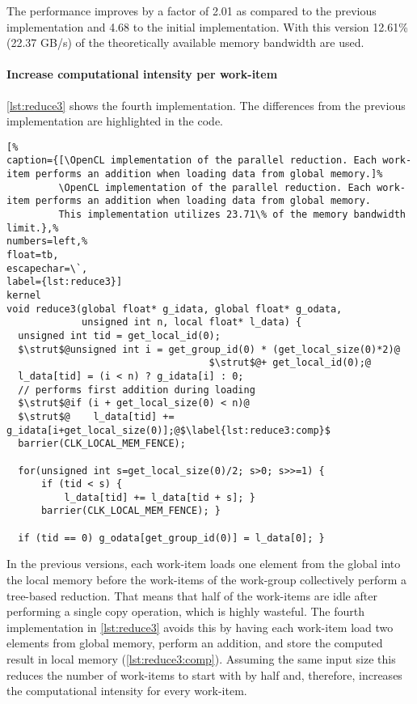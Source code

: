 The performance improves by a factor of 2.01 as compared to the previous implementation and 4.68 to the initial implementation.
With this version 12.61\% (22.37 GB/s) of the theoretically available memory bandwidth are used.



\FloatBarrier
\newpage

\paragraph{Increase computational intensity per work-item}

\autoref{lst:reduce3} shows the fourth implementation.
The differences from the previous implementation are highlighted in the code.
\begin{lstlisting}[%
caption={[\OpenCL implementation of the parallel reduction. Each work-item performs an addition when loading data from global memory.]%
         \OpenCL implementation of the parallel reduction. Each work-item performs an addition when loading data from global memory.
         This implementation utilizes 23.71\% of the memory bandwidth limit.},%
numbers=left,%
float=tb,
escapechar=\`,
label={lst:reduce3}]
kernel
void reduce3(global float* g_idata, global float* g_odata,
             unsigned int n, local float* l_data) {
  unsigned int tid = get_local_id(0);
  $\strut$@unsigned int i = get_group_id(0) * (get_local_size(0)*2)@
                                   $\strut$@+ get_local_id(0);@
  l_data[tid] = (i < n) ? g_idata[i] : 0;
  // performs first addition during loading
  $\strut$@if (i + get_local_size(0) < n)@
  $\strut$@    l_data[tid] += g_idata[i+get_local_size(0)];@$\label{lst:reduce3:comp}$
  barrier(CLK_LOCAL_MEM_FENCE);

  for(unsigned int s=get_local_size(0)/2; s>0; s>>=1) {
      if (tid < s) {
          l_data[tid] += l_data[tid + s]; }
      barrier(CLK_LOCAL_MEM_FENCE); }

  if (tid == 0) g_odata[get_group_id(0)] = l_data[0]; }
\end{lstlisting}

In the previous versions, each work-item loads one element from the global into the local memory before the work-items of the work-group collectively perform a tree-based reduction.
That means that half of the work-items are idle after performing a single copy operation, which is highly wasteful.
The fourth implementation in \autoref{lst:reduce3} avoids this by having each work-item load two elements from global memory, perform an addition, and store the computed result in local memory (\autoref{lst:reduce3:comp}).
Assuming the same input size this reduces the number of work-items to start with by half and, therefore, increases the computational intensity for every work-item.

